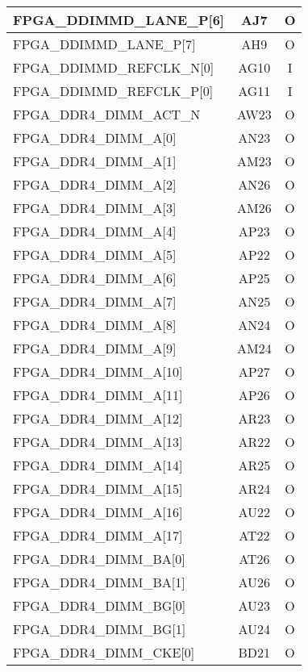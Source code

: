 \begin{longtable}[l]{| l | c | c |}
  FPGA\_DDIMMD\_LANE\_P[6]     & AJ7  & O   \\ \hline
  FPGA\_DDIMMD\_LANE\_P[7]     & AH9  & O   \\ \hline
  FPGA\_DDIMMD\_REFCLK\_N[0]   & AG10 & I   \\ \hline
  FPGA\_DDIMMD\_REFCLK\_P[0]   & AG11 & I   \\ \hline
  FPGA\_DDR4\_DIMM\_ACT\_N     & AW23 & O   \\ \hline
  FPGA\_DDR4\_DIMM\_A[0]       & AN23 & O   \\ \hline
  FPGA\_DDR4\_DIMM\_A[1]       & AM23 & O   \\ \hline
  FPGA\_DDR4\_DIMM\_A[2]       & AN26 & O   \\ \hline
  FPGA\_DDR4\_DIMM\_A[3]       & AM26 & O   \\ \hline
  FPGA\_DDR4\_DIMM\_A[4]       & AP23 & O   \\ \hline
  FPGA\_DDR4\_DIMM\_A[5]       & AP22 & O   \\ \hline
  FPGA\_DDR4\_DIMM\_A[6]       & AP25 & O   \\ \hline
  FPGA\_DDR4\_DIMM\_A[7]       & AN25 & O   \\ \hline
  FPGA\_DDR4\_DIMM\_A[8]       & AN24 & O   \\ \hline
  FPGA\_DDR4\_DIMM\_A[9]       & AM24 & O   \\ \hline
  FPGA\_DDR4\_DIMM\_A[10]      & AP27 & O   \\ \hline
  FPGA\_DDR4\_DIMM\_A[11]      & AP26 & O   \\ \hline
  FPGA\_DDR4\_DIMM\_A[12]      & AR23 & O   \\ \hline
  FPGA\_DDR4\_DIMM\_A[13]      & AR22 & O   \\ \hline
  FPGA\_DDR4\_DIMM\_A[14]      & AR25 & O   \\ \hline
  FPGA\_DDR4\_DIMM\_A[15]      & AR24 & O   \\ \hline
  FPGA\_DDR4\_DIMM\_A[16]      & AU22 & O   \\ \hline
  FPGA\_DDR4\_DIMM\_A[17]      & AT22 & O   \\ \hline
  FPGA\_DDR4\_DIMM\_BA[0]      & AT26 & O   \\ \hline
  FPGA\_DDR4\_DIMM\_BA[1]      & AU26 & O   \\ \hline
  FPGA\_DDR4\_DIMM\_BG[0]      & AU23 & O   \\ \hline
  FPGA\_DDR4\_DIMM\_BG[1]      & AU24 & O   \\ \hline
  FPGA\_DDR4\_DIMM\_CKE[0]     & BD21 & O   \\ \hline

\end{longtable}
